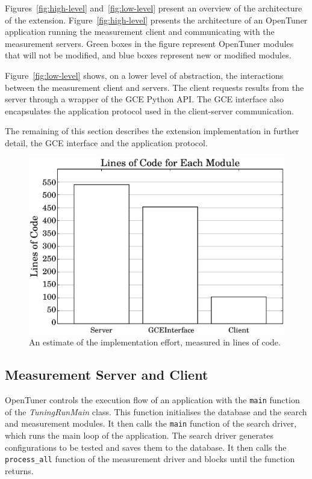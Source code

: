 \documentclass[a4paper, 12pt]{article}
\begin{document}
Figures~\ref{fig:high-level} and~\ref{fig:low-level} present an
overview of the architecture of the extension.
Figure~\ref{fig:high-level} presents the architecture of an OpenTuner
application running the measurement client and communicating with the
measurement servers.  Green boxes in the figure represent OpenTuner modules
that will not be modified, and blue boxes represent new or modified modules.

Figure~\ref{fig:low-level} shows, on a lower level of abstraction, the
interactions between the measurement client and servers. The client
requests results from the server through a wrapper of the GCE Python API.
The GCE interface also encapsulates the application protocol used in
the client-server communication.

The remaining of this section describes the extension implementation in further
detail, the GCE interface and the application protocol.

\begin{figure}[htpb]
    \centering
    \includegraphics[scale=.35]{loc_comparison}
    \caption{An estimate of the implementation effort, measured in lines of code.}
    \label{fig:loc-comp}
\end{figure}

\subsection{Measurement Server and Client}
\label{sec:server-client}

OpenTuner controls the execution flow of an application with the
\texttt{\footnotesize main} function of the \emph{TuningRunMain} class. This
function initialises the database and the search and measurement modules. It
then calls the \texttt{\footnotesize main} function of the search driver, which
runs the main loop of the application.  The search driver generates
configurations to be tested and saves them to the database. It then calls the
\texttt{\footnotesize process\_all} function of the measurement driver and
blocks until the function returns.
\end{document}
